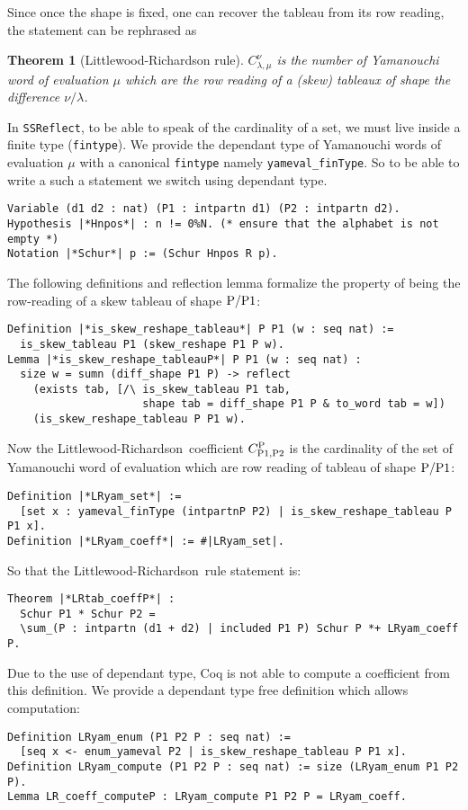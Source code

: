 \documentclass[12pt]{article}
\let\verb=\lstinline
\newcommand{\SSR}{\texttt{SSReflect}\xspace}
\newcommand{\LR}{Littlewood-Richardson\ }
\newcommand{\var}[1]{\text{\verb{#1}}}
\newtheorem{THEO}{Theorem}
\begin{document}
Since once the shape is fixed, one can recover the tableau from its row
reading, the statement can be rephrased as
\begin{THEO}[Littlewood-Richardson rule]
  $C_{\lambda, \mu}^{\nu}$ is the number of Yamanouchi word of evaluation
  $\mu$ which are the row reading of a (skew) tableaux of shape the difference
  $\nu/\lambda$.
\end{THEO}

In \SSR, to be able to speak of the cardinality of a set, we must live inside
a finite type (\verb{fintype}). We provide the dependant type of Yamanouchi
words of evaluation $\mu$ with a canonical \verb{fintype} namely
\verb{yameval_finType}. So to be able to write a such a statement we switch
using dependant type.
\begin{lstlisting}
Variable (d1 d2 : nat) (P1 : intpartn d1) (P2 : intpartn d2).
Hypothesis |*Hnpos*| : n != 0%
Notation |*Schur*| p := (Schur Hnpos R p).
\end{lstlisting}
The following definitions and reflection lemma formalize the property of being
the row-reading of a skew tableau of shape $\var{P}/\var{P1}$:
\begin{lstlisting}
Definition |*is_skew_reshape_tableau*| P P1 (w : seq nat) :=
  is_skew_tableau P1 (skew_reshape P1 P w).
Lemma |*is_skew_reshape_tableauP*| P P1 (w : seq nat) :
  size w = sumn (diff_shape P1 P) -> reflect
    (exists tab, [/\ is_skew_tableau P1 tab,
                     shape tab = diff_shape P1 P & to_word tab = w])
    (is_skew_reshape_tableau P P1 w).
\end{lstlisting}
Now the \LR coefficient $C_{\var{P1},\var{P2}}^{\var{P}}$ is the cardinality of
the set of Yamanouchi word of evaluation which are row reading of tableau of
shape $\var{P}/\var{P1}$:
\begin{lstlisting}
Definition |*LRyam_set*| :=
  [set x : yameval_finType (intpartnP P2) | is_skew_reshape_tableau P P1 x].
Definition |*LRyam_coeff*| := #|LRyam_set|.
\end{lstlisting}
So that the \LR rule statement is:
\begin{lstlisting}
Theorem |*LRtab_coeffP*| :
  Schur P1 * Schur P2 =
  \sum_(P : intpartn (d1 + d2) | included P1 P) Schur P *+ LRyam_coeff P.
\end{lstlisting}
Due to the use of dependant type, Coq is not able to compute a coefficient
from this definition. We provide a dependant type free definition which allows
computation:
\begin{lstlisting}
Definition LRyam_enum (P1 P2 P : seq nat) :=
  [seq x <- enum_yameval P2 | is_skew_reshape_tableau P P1 x].
Definition LRyam_compute (P1 P2 P : seq nat) := size (LRyam_enum P1 P2 P).
Lemma LR_coeff_computeP : LRyam_compute P1 P2 P = LRyam_coeff.
\end{lstlisting}
\end{document}
